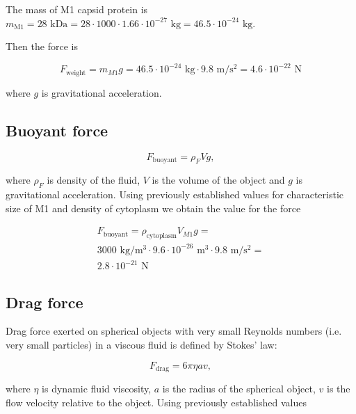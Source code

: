 The mass of M1 capsid protein is $m_{\text{M1}} = 28 \text{ kDa} = 28 \cdot 1000 \cdot 1.66 \cdot 10^{-27} \text{ kg} = 46.5 \cdot 10^{-24} \text{ kg}$. \cite{shtykova2013structural}

Then the force is

\begin{equation}
F_{\text{weight}} = m_{M1}g = 46.5 \cdot 10^{-24} \text{ kg} \cdot 9.8 \text{ m}/\text{s}^2 = 4.6 \cdot 10^{-22} \text{ N}
\end{equation}

where $g$ is gravitational acceleration.

\subsection{Buoyant force}

\begin{equation}
F_{\text{buoyant}} = \rho_FVg,
\end{equation}

where $\rho_F$ is density of the fluid, $V$ is the volume of the object and $g$ is gravitational acceleration. Using previously established values for characteristic size of M1 and density of cytoplasm we obtain the value for the force

\begin{equation}
\begin{split}
F_{\text{buoyant}} = \rho_{\text{cytoplasm}}V_{M1}g =\\
3000 \text{ kg}/\text{m}^3 \cdot 9.6 \cdot 10^{-26} \text{ m}^3 \cdot 9.8 \text{ m}/\text{s}^2 =\\
2.8 \cdot 10^{-21} \text{ N}
\end{split}
\end{equation}

\subsection{Drag force}

Drag force exerted on spherical objects with very small Reynolds numbers (i.e. very small particles) in a viscous fluid is defined by Stokes' law:

\begin{equation}
F_{\text{drag}} = 6\pi\eta av,
\end{equation}

where $\eta$ is dynamic fluid viscosity, $a$ is the radius of the spherical object, $v$ is the flow velocity relative to the object. Using previously established values

